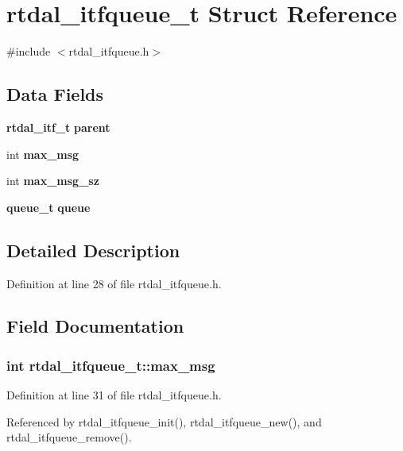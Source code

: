 \section{rtdal\-\_\-itfqueue\-\_\-t Struct Reference}
\label{structrtdal__itfqueue__t}


{\ttfamily \#include $<$rtdal\-\_\-itfqueue.\-h$>$}

\subsection*{Data Fields}
\begin{DoxyCompactItemize}
\item 
{\bf rtdal\-\_\-itf\-\_\-t} {\bf parent}
\item 
int {\bf max\-\_\-msg}
\item 
int {\bf max\-\_\-msg\-\_\-sz}
\item 
{\bf queue\-\_\-t} {\bf queue}
\end{DoxyCompactItemize}


\subsection{Detailed Description}


Definition at line 28 of file rtdal\-\_\-itfqueue.\-h.



\subsection{Field Documentation}
\subsubsection[{max\-\_\-msg}]{\setlength{\rightskip}{0pt plus 5cm}int rtdal\-\_\-itfqueue\-\_\-t\-::max\-\_\-msg}\label{structrtdal__itfqueue__t_a8b3a2a03ddb8bb0ad7aa79b78bae6d11}


Definition at line 31 of file rtdal\-\_\-itfqueue.\-h.



Referenced by rtdal\-\_\-itfqueue\-\_\-init(), rtdal\-\_\-itfqueue\-\_\-new(), and rtdal\-\_\-itfqueue\-\_\-remove().

